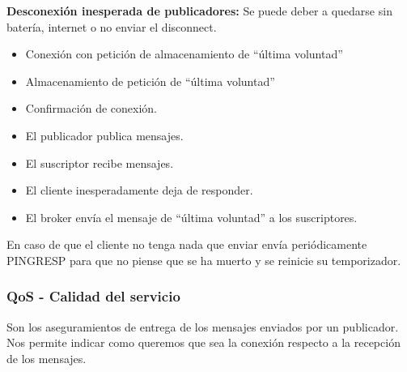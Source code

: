 \documentclass[12pt, twoside, openright]{report} %
\begin{document}
\textbf{Desconexión inesperada de publicadores:} Se puede deber a quedarse sin batería, internet o no enviar el disconnect.
\begin{itemize}
	\item Conexión con petición de almacenamiento de “última voluntad”
	\item Almacenamiento de petición de “última voluntad”
	\item Confirmación de conexión.
	\item El publicador publica mensajes.
	\item El suscriptor recibe mensajes.
	\item El cliente inesperadamente deja de responder.
	\item El broker envía el mensaje de “última voluntad” a los suscriptores.
\end{itemize}
En caso de que el cliente no tenga nada que enviar envía periódicamente PINGRESP para que no piense que se ha muerto y se reinicie su temporizador.


\subsubsection{QoS - Calidad del servicio}
Son los aseguramientos de entrega de los mensajes enviados por un publicador. Nos permite indicar como queremos que sea la conexión respecto a la recepción de los mensajes.
\end{document}
